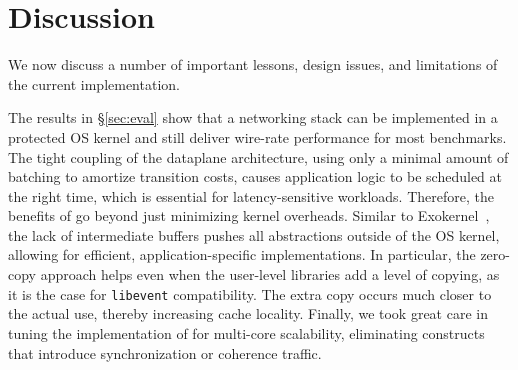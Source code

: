 
\section{Discussion}
\label{sec:disc}

We now discuss a number of important lessons, design issues, and
limitations of the current \ix implementation.

 The results in \S\ref{sec:eval}
show that a networking stack can be implemented in a protected OS
kernel and still deliver wire-rate performance for most benchmarks.
The tight coupling of the dataplane architecture, using only a minimal
amount of batching to amortize transition costs, causes application
logic to be scheduled at the right time, which is essential for
latency-sensitive workloads.  Therefore, the benefits of \ix go beyond
just minimizing kernel overheads. Similar to
Exokernel~\cite{DBLP:conf/sosp/EnglerKO95}, the lack of intermediate
buffers pushes all abstractions outside of the OS kernel, allowing for
efficient, application-specific implementations.  In particular, the
zero-copy approach helps even when the user-level libraries add a
level of copying, as it is the case for \texttt{libevent}
compatibility.  The extra copy occurs much closer to the actual use,
thereby increasing cache locality.  Finally, we took great care in
tuning the implementation of \ix for multi-core scalability,
eliminating constructs that introduce synchronization or coherence
traffic.


